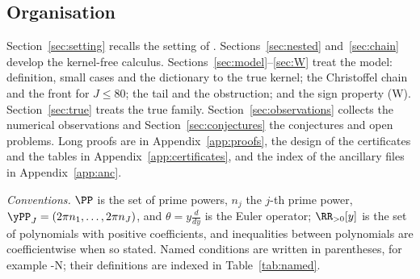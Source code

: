 \subsection{Organisation}\label{ssec:intro-organisation}

Section~\ref{sec:setting} recalls the setting of \cite{PaperI}. Sections~\ref{sec:nested} and~\ref{sec:chain} develop the
kernel-free calculus. Sections~\ref{sec:model}--\ref{sec:W} treat the model: definition, small cases and the dictionary
to the true kernel; the Christoffel chain and the front for $J\le80$; the tail and the obstruction; and the sign property
(W). Section~\ref{sec:true} treats the true family. Section~\ref{sec:observations} collects the numerical observations and
Section~\ref{sec:conjectures} the conjectures and open problems. Long proofs are in Appendix~\ref{app:proofs}, the design of
the certificates and the tables in Appendix~\ref{app:certificates}, and the index of the ancillary files in
Appendix~\ref{app:anc}.

\emph{Conventions.} $\PP$ is the set of prime powers, $n_j$ the $j$-th prime power, $\yPP_J=(2\pi n_1,\dots,2\pi n_J)$, and
$\theta=y\frac{d}{dy}$ is the Euler operator; $\RR_{>0}[y]$ is the set of polynomials with positive coefficients, and inequalities
between polynomials are coefficientwise when so stated. Named conditions are written in parentheses, for example \hyp{N}; their
definitions are indexed in Table~\ref{tab:named}.
